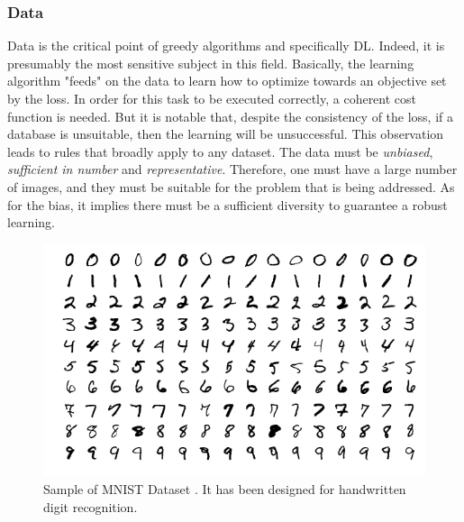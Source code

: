 \subsubsection{Data}

Data is the critical point of greedy algorithms and specifically  DL. Indeed, it is presumably the most sensitive subject in this field.
Basically, the learning algorithm "feeds" on the data to learn how to optimize towards an objective set by the loss. In order for this task to be executed correctly, a coherent cost function is needed. But it is notable that, despite the consistency of the loss, if a database is unsuitable, then the learning will be unsuccessful.
This observation leads to rules that broadly apply to any dataset. 
The data must be \emph{unbiased}, \emph{sufficient in number} and \emph{representative}. Therefore, one must have a large number of images, and they must be suitable for the problem that is being addressed. As for the bias, it implies there must be a sufficient diversity to guarantee a robust learning.\\

\begin{figure}[h]
	\centering
	\includegraphics[width=0.8\linewidth]{Figures/Preliminary/mnist}
	\caption[Sample of MNIST Dataset.]{Sample of MNIST Dataset \cite{lecun-mnisthandwrittendigit-2010}. It has been designed for handwritten digit recognition.}
	\label{fig:mnist}
\end{figure}


